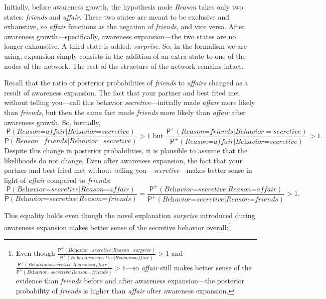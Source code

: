 \documentclass[
  11pt,
  dvipsnames,enabledeprecatedfontcommands]{scrartcl}
\newcommand{\pr}[1]{\ensuremath{\mathsf{P}(#1)}}
\newcommand{\ppr}[2]{\ensuremath{\mathsf{P}^{#1}(#2)}}
\begin{document}
\noindent Initially, before awareness growth, the hypothesis node
\textit{Reason} takes only two states: \textit{friends} and
\textit{affair}. These two states are meant to be exclusive and
exhaustive, so \textit{affair} functions as the negation of
\textit{friends}, and vice versa. After awareness growth---specifically,
awareness expansion---the two states are no longer exhaustive. A third
state is added: \textit{surprise}. So, in the formalism we are using,
expansion simply consists in the addition of an extra state to one of
the nodes of the network. The rest of the structure of the network
remains intact.

Recall that the ratio of posterior probabilities of \textit{friends} to
\textit{affairs} changed as a result of awareness expansion. The fact
that your partner and best fried met without telling you---call this
behavior \textit{secretive}---initially made \textit{affair} more likely
than \textit{friends}, but then the same fact made \textit{friends} more
likely than \textit{affair} after awareness growth. So, formally,
\[\frac{\pr{\textit{Reason=affair} \vert \textit{Behavior=secretive}}}{\pr{\textit{Reason=friends} \vert \textit{Behavior=secretive}}} > 1 \text{ but } \frac{\ppr{+}{\textit{Reason=friends} \vert Behavior=secretive}}{\ppr{+}{\textit{Reason=affair} \vert \textit{Behavior=secretive}}}>1.\]
Despite this change in posterior probabilities, it is plausible to
assume that the likelihoods do not change. Even after awareness
expansion, the fact that your partner and best fried met without telling
you---\textit{secretive}---makes better sense in light of
\textit{affair} compared to \textit{friends}:
\[\frac{\pr{\textit{Behavior=secretive} \vert \textit{Reason=affair}}}{\pr{\textit{Behavior=secretive} \vert  \textit{Reason=friends}}} = \frac{\ppr{+}{\textit{Behavior=secretive} \vert \textit{Reason=affair}}}{\ppr{+}{\textit{Behavior=secretive} \vert \textit{Reason=friends}}}>1.\]

\noindent This equality holds even though the novel explanation
\textit{surprise} introduced during awareness expansion makes better
sense of the secretive behavior overall:\footnote{Even though
  \(\frac{\ppr{+}{\textit{Behavior=secretive} \vert \textit{Reason=surprise}}}{\ppr{+}{\textit{Behavior=secretive} \vert \textit{Reason=affair}}}>1\)
  and
  \(\frac{\ppr{+}{\textit{Behavior=secretive} \vert \textit{Reason=affair}}}{\ppr{+}{\textit{Behavior=secretive} \vert \textit{Reason=friends}}}>1\)---so
  \textit{affair} still makes better sense of the evidence than
  \textit{friends} before and after awareness expansion---the posterior
  probability of \textit{friends} is higher than \textit{affair} after
  awareness expansion.}
\end{document}
